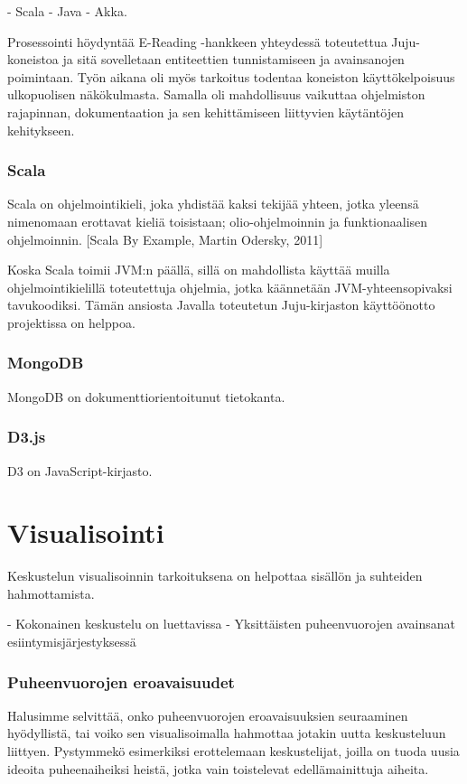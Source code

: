 \documentclass[11pt,a4paper,oneside]{memoir}
\begin{document}
- Scala
- Java
- Akka.

Prosessointi höydyntää E-Reading -hankkeen yhteydessä toteutettua Juju-koneistoa ja sitä sovelletaan entiteettien tunnistamiseen ja avainsanojen poimintaan. Työn aikana oli myös tarkoitus todentaa koneiston käyttökelpoisuus ulkopuolisen näkökulmasta. Samalla oli mahdollisuus vaikuttaa ohjelmiston rajapinnan, dokumentaation ja sen kehittämiseen liittyvien käytäntöjen kehitykseen.

\subsection{Scala}
Scala on ohjelmointikieli, joka yhdistää kaksi tekijää yhteen, jotka yleensä nimenomaan erottavat kieliä toisistaan; olio-ohjelmoinnin ja funktionaalisen ohjelmoinnin.  
[Scala By Example, Martin Odersky, 2011]

Koska Scala toimii JVM:n päällä, sillä on mahdollista käyttää muilla ohjelmointikielillä toteutettuja ohjelmia, jotka käännetään JVM-yhteensopivaksi tavukoodiksi. Tämän ansiosta Javalla toteutetun Juju-kirjaston käyttöönotto projektissa on helppoa.

\subsection{MongoDB}
MongoDB on dokumenttiorientoitunut tietokanta. 

\subsection{D3.js}
D3 on JavaScript-kirjasto.

\chapter{Visualisointi}
Keskustelun visualisoinnin tarkoituksena on helpottaa sisällön ja suhteiden hahmottamista.

- Kokonainen keskustelu on luettavissa
- Yksittäisten puheenvuorojen avainsanat esiintymisjärjestyksessä

\subsection{Puheenvuorojen eroavaisuudet}
Halusimme selvittää, onko puheenvuorojen eroavaisuuksien seuraaminen hyödyllistä, tai voiko sen visualisoimalla hahmottaa jotakin uutta keskusteluun liittyen. Pystymmekö esimerkiksi erottelemaan keskustelijat, joilla on tuoda uusia ideoita puheenaiheiksi heistä, jotka vain toistelevat edellämainittuja aiheita.
\end{document}
